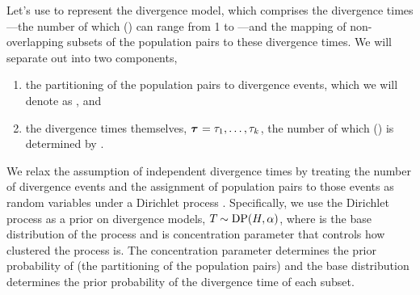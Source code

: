 Let's use \divtimemodel to represent the divergence model, which comprises the
divergence times---the number of which (\nevents{}) can range from 1 to
\ncomparisons{}---and the mapping of non-overlapping subsets of the population
pairs to these \nevents{} divergence times.
We will separate out \divtimemodel into two components,
\begin{enumerate}
    \item the partitioning of the \ncomparisons{} population pairs to
        divergence events, which we will denote as \divtimesets, and
    \item the divergence times themselves,
        $\divtimes = \divtime[1], \ldots, \divtime[\nevents]$,
        the number of which (\nevents{}) is determined by \divtimesets.
\end{enumerate}
We relax the assumption of independent divergence times by treating the number
of divergence events and the assignment of population pairs to those events as
random variables under a Dirichlet process \citep{Ferguson1973,
    Antoniak1974}.
Specifically, we use the Dirichlet process as a prior on divergence models,
$\divtimemodel \sim \dirp(\basedistribution, \concentration)$, where
\basedistribution is the base distribution of the process and \concentration is
concentration parameter that controls how clustered the process is.
The concentration parameter determines the prior probability of
\divtimesets
(the partitioning of the population pairs)
and the base distribution determines the prior probability of the divergence
time of each subset.

